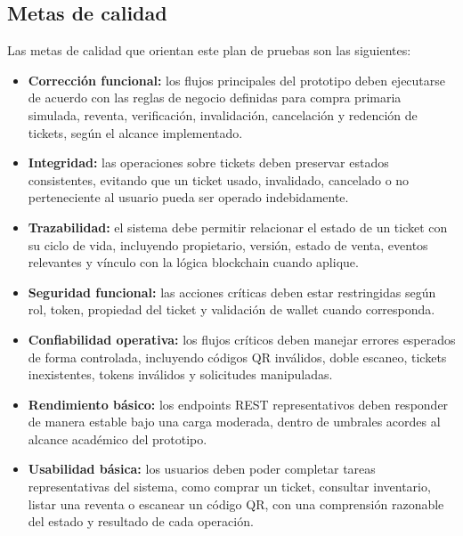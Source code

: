 \documentclass[12pt,letterpaper]{article}
\begin{document}
\subsection{Metas de calidad}

Las metas de calidad que orientan este plan de pruebas son las siguientes:

\begin{itemize}
    \item \textbf{Corrección funcional:} los flujos principales del prototipo deben ejecutarse de acuerdo con las reglas de negocio definidas para compra primaria simulada, reventa, verificación, invalidación, cancelación y redención de tickets, según el alcance implementado.

    \item \textbf{Integridad:} las operaciones sobre tickets deben preservar estados consistentes, evitando que un ticket usado, invalidado, cancelado o no perteneciente al usuario pueda ser operado indebidamente.

    \item \textbf{Trazabilidad:} el sistema debe permitir relacionar el estado de un ticket con su ciclo de vida, incluyendo propietario, versión, estado de venta, eventos relevantes y vínculo con la lógica blockchain cuando aplique.

    \item \textbf{Seguridad funcional:} las acciones críticas deben estar restringidas según rol, token, propiedad del ticket y validación de wallet cuando corresponda.

    \item \textbf{Confiabilidad operativa:} los flujos críticos deben manejar errores esperados de forma controlada, incluyendo códigos QR inválidos, doble escaneo, tickets inexistentes, tokens inválidos y solicitudes manipuladas.

    \item \textbf{Rendimiento básico:} los endpoints REST representativos deben responder de manera estable bajo una carga moderada, dentro de umbrales acordes al alcance académico del prototipo.

    \item \textbf{Usabilidad básica:} los usuarios deben poder completar tareas representativas del sistema, como comprar un ticket, consultar inventario, listar una reventa o escanear un código QR, con una comprensión razonable del estado y resultado de cada operación.
\end{itemize}
\end{document}
